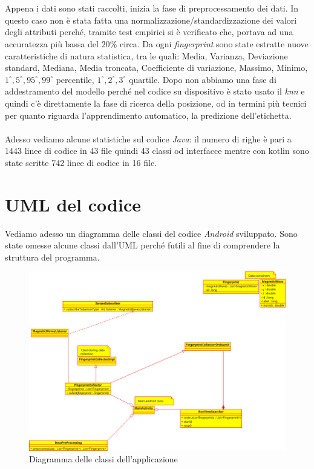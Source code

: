 \\\\
Appena i dati sono stati raccolti, inizia la fase di preprocessamento dei dati. In questo caso non \`e stata fatta una normalizzazione/standardizzazione dei valori degli attributi perch\'e, tramite test empirici si \`e verificato che, portava ad una accuratezza pi\`u  bassa del $20\%$ circa. Da ogni \textit{fingerprint} sono state estratte nuove caratteristiche di natura statistica, tra le quali: Media, Varianza, Deviazione standard, Mediana, Media troncata, Coefficiente di variazione, Massimo, Minimo, $ 1^{\circ}, 5^{\circ}, 95^{\circ}, 99^{\circ} $ percentile, $ 1^{\circ}, 2^{\circ}, 3^{\circ} $ quartile.
Dopo non abbiamo una fase di addestramento del modello perch\'e nel codice su dispositivo  \`e stato usato il \textit{knn} e quindi c'\`e direttamente la fase di ricerca della posizione, od in termini pi\`u  tecnici per quanto riguarda l'apprendimento automatico, la predizione dell'etichetta.
\\\\
Adesso vediamo alcune statistiche sul codice \textit{Java}: il numero di righe \`e pari a 1443 linee di codice in 43 file quindi 43 classi od interfacce mentre con kotlin sono state scritte 742 linee di codice in 16 file.


\section{UML del codice}
Vediamo adesso un diagramma delle classi del codice \textit{Android} sviluppato. Sono state omesse alcune classi dall'UML perch\'e futili al fine di comprendere la struttura del programma.

\begin{figure}[H]
	\centering
	\includegraphics[width=1\linewidth]{img/class_diagram}
	\caption{Diagramma delle classi dell'applicazione}
	\label{fig:classdiagram}
\end{figure}

